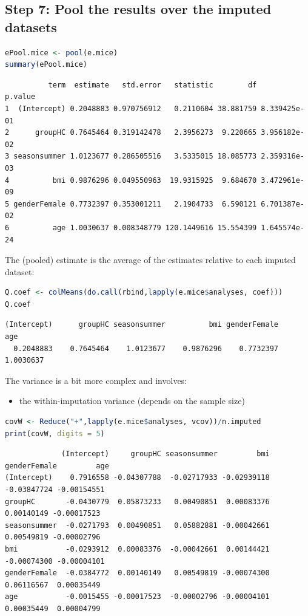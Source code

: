 \documentclass[12pt]{article}
\begin{document}
\clearpage
\subsection{Step 7: Pool the results over the imputed datasets}
\label{sec:org59266d6}

\begin{lstlisting}[language=r,numbers=none]
ePool.mice <- pool(e.mice)
summary(ePool.mice)
\end{lstlisting}

\label{}
\begin{verbatim}
          term  estimate   std.error   statistic        df      p.value
1  (Intercept) 0.2048883 0.970756912   0.2110604 38.881759 8.339425e-01
2      groupHC 0.7645464 0.319142478   2.3956273  9.220665 3.956182e-02
3 seasonsummer 1.0123677 0.286505516   3.5335015 18.085773 2.359316e-03
4          bmi 0.9876296 0.049550963  19.9315925  9.684670 3.472961e-09
5 genderFemale 0.7732397 0.353001211   2.1904733  6.590121 6.701387e-02
6          age 1.0030637 0.008348779 120.1449616 15.554399 1.645574e-24
\end{verbatim}



The (pooled) estimate is the average of the estimates relative to each
imputed dataset:
\begin{lstlisting}[language=r,numbers=none]
Q.coef <- colMeans(do.call(rbind,lapply(e.mice$analyses, coef)))
Q.coef
\end{lstlisting}

\label{}
\begin{verbatim}
(Intercept)      groupHC seasonsummer          bmi genderFemale          age 
  0.2048883    0.7645464    1.0123677    0.9876296    0.7732397    1.0030637
\end{verbatim}


The variance is a bit more complex and involves:
\begin{itemize}
\item the within-imputation variance (depends on the sample size)
\end{itemize}
\begin{lstlisting}[language=r,numbers=none]
covW <- Reduce("+",lapply(e.mice$analyses, vcov))/n.imputed
print(covW, digits = 5)
\end{lstlisting}

\label{}
\begin{verbatim}
             (Intercept)     groupHC seasonsummer         bmi genderFemale         age
(Intercept)    0.7916558 -0.04307788  -0.02717933 -0.02939118  -0.03847724 -0.00154551
groupHC       -0.0430779  0.05873233   0.00490851  0.00083376   0.00140149 -0.00017523
seasonsummer  -0.0271793  0.00490851   0.05882881 -0.00042661   0.00549819 -0.00002796
bmi           -0.0293912  0.00083376  -0.00042661  0.00144421  -0.00074300 -0.00004101
genderFemale  -0.0384772  0.00140149   0.00549819 -0.00074300   0.06116567  0.00035449
age           -0.0015455 -0.00017523  -0.00002796 -0.00004101   0.00035449  0.00004799
\end{verbatim}
\end{document}
